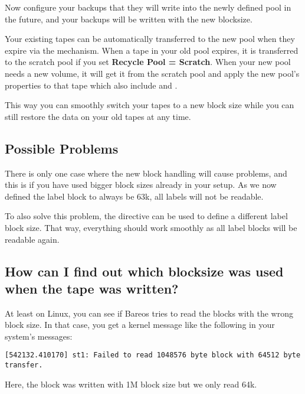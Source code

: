 
Now configure your backups that they will write into the newly defined pool in the
future, and your backups will be written with the new blocksize.

Your existing tapes can be automatically transferred to the new pool when they expire
via the  mechanism. When a tape in your old pool expires, it is
transferred to the scratch pool if you set
{\bf Recycle Pool = Scratch}. When your new pool needs a new volume, it will get it
from the scratch pool and apply the new pool's properties to that tape which also
include  and .

This way you can smoothly switch your tapes to a new block size while you can still
restore the data on your old tapes at any time.

\subsection*{Possible Problems}
There is only one case where the new block handling will cause problems, and this
is if you have used bigger block sizes already in your setup. As we now defined the
label block to always be 63k, all labels will not be readable.

To also solve this problem, the directive  can be used to define
a different label block size.  That way, everything should work smoothly as all label
blocks will be readable again.


\subsection*{How can I find out which blocksize was used when the tape was written?}

At least on Linux, you can see if Bareos tries to read the blocks with the
wrong block size. In that case, you get a kernel message like the following in
your system's messages:
\begin{verbatim}
[542132.410170] st1: Failed to read 1048576 byte block with 64512 byte transfer.
\end{verbatim}
Here, the block was written with 1M block size but we only read 64k.

